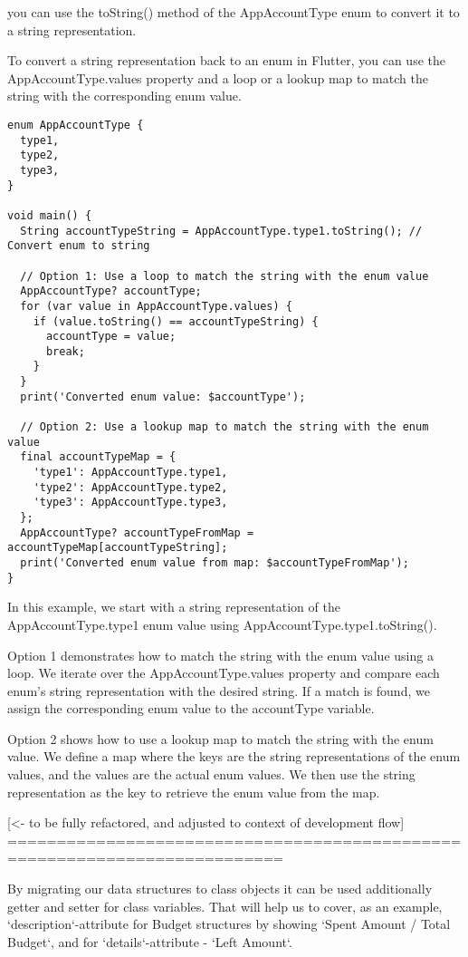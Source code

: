 you can use the toString() method of the AppAccountType enum to convert it to a string representation.

To convert a string representation back to an enum in Flutter, you can use the AppAccountType.values property and a 
loop or a lookup map to match the string with the corresponding enum value.

\begin{lstlisting}
enum AppAccountType {
  type1,
  type2,
  type3,
}

void main() {
  String accountTypeString = AppAccountType.type1.toString(); // Convert enum to string

  // Option 1: Use a loop to match the string with the enum value
  AppAccountType? accountType;
  for (var value in AppAccountType.values) {
    if (value.toString() == accountTypeString) {
      accountType = value;
      break;
    }
  }
  print('Converted enum value: $accountType');

  // Option 2: Use a lookup map to match the string with the enum value
  final accountTypeMap = {
    'type1': AppAccountType.type1,
    'type2': AppAccountType.type2,
    'type3': AppAccountType.type3,
  };
  AppAccountType? accountTypeFromMap = accountTypeMap[accountTypeString];
  print('Converted enum value from map: $accountTypeFromMap');
}
\end{lstlisting}

In this example, we start with a string representation of the AppAccountType.type1 enum value using 
AppAccountType.type1.toString().

Option 1 demonstrates how to match the string with the enum value using a loop. We iterate over the 
AppAccountType.values property and compare each enum's string representation with the desired string. 
If a match is found, we assign the corresponding enum value to the accountType variable.

Option 2 shows how to use a lookup map to match the string with the enum value. We define a map where the keys 
are the string representations of the enum values, and the values are the actual enum values. We then use the 
string representation as the key to retrieve the enum value from the map.

[<- to be fully refactored, and adjusted to context of development flow]
==========================================================================

By migrating our data structures to class objects it can be used additionally getter and setter for class variables.
That will help us to cover, as an example, `description`-attribute for Budget structures by showing 
`Spent Amount / Total Budget`, and for `details`-attribute - `Left Amount`.

